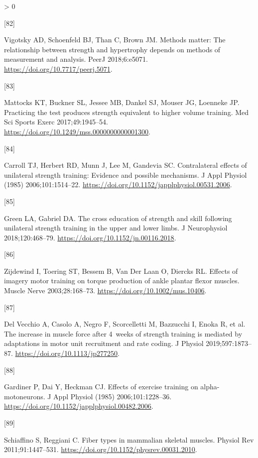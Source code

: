 \documentclass[twoside,10pt]{gihclass} %
\newlength{\cslhangindent}
\newlength{\csllabelwidth}
\newenvironment{CSLReferences}[3] %
 {%
  \setlength{\parindent}{0pt}
  \ifodd #1 \everypar{\setlength{\hangindent}{\cslhangindent}}\ignorespaces\fi
  \ifnum #2 > 0
  \setlength{\parskip}{#2\baselineskip}
  \fi
 }%
 {}
\newcommand{\CSLLeftMargin}[1]{\parbox[t]{\maxof{\widthof{#1}}{\csllabelwidth}}{#1}}
\newcommand{\CSLRightInline}[1]{\parbox[t]{\linewidth}{#1}}
\begin{document}
\begin{CSLReferences}{0}{0}
\leavevmode\hypertarget{ref-RN2158}{}%
\CSLLeftMargin{{[}82{]} }
\CSLRightInline{Vigotsky AD, Schoenfeld BJ, Than C, Brown JM. Methods matter: The relationship between strength and hypertrophy depends on methods of measurement and analysis. PeerJ 2018;6:e5071. \url{https://doi.org/10.7717/peerj.5071}.}

\leavevmode\hypertarget{ref-RN2760}{}%
\CSLLeftMargin{{[}83{]} }
\CSLRightInline{Mattocks KT, Buckner SL, Jessee MB, Dankel SJ, Mouser JG, Loenneke JP. Practicing the test produces strength equivalent to higher volume training. Med Sci Sports Exerc 2017;49:1945--54. \url{https://doi.org/10.1249/mss.0000000000001300}.}

\leavevmode\hypertarget{ref-RN2219}{}%
\CSLLeftMargin{{[}84{]} }
\CSLRightInline{Carroll TJ, Herbert RD, Munn J, Lee M, Gandevia SC. Contralateral effects of unilateral strength training: Evidence and possible mechanisms. J Appl Physiol (1985) 2006;101:1514--22. \url{https://doi.org/10.1152/japplphysiol.00531.2006}.}

\leavevmode\hypertarget{ref-RN2766}{}%
\CSLLeftMargin{{[}85{]} }
\CSLRightInline{Green LA, Gabriel DA. The cross education of strength and skill following unilateral strength training in the upper and lower limbs. J Neurophysiol 2018;120:468--79. \url{https://doi.org/10.1152/jn.00116.2018}.}

\leavevmode\hypertarget{ref-RN2767}{}%
\CSLLeftMargin{{[}86{]} }
\CSLRightInline{Zijdewind I, Toering ST, Bessem B, Van Der Laan O, Diercks RL. Effects of imagery motor training on torque production of ankle plantar flexor muscles. Muscle Nerve 2003;28:168--73. \url{https://doi.org/10.1002/mus.10406}.}

\leavevmode\hypertarget{ref-RN2763}{}%
\CSLLeftMargin{{[}87{]} }
\CSLRightInline{Del Vecchio A, Casolo A, Negro F, Scorcelletti M, Bazzucchi I, Enoka R, et al. The increase in muscle force after 4~weeks of strength training is mediated by adaptations in motor unit recruitment and rate coding. J Physiol 2019;597:1873--87. \url{https://doi.org/10.1113/jp277250}.}

\leavevmode\hypertarget{ref-RN2764}{}%
\CSLLeftMargin{{[}88{]} }
\CSLRightInline{Gardiner P, Dai Y, Heckman CJ. Effects of exercise training on alpha-motoneurons. J Appl Physiol (1985) 2006;101:1228--36. \url{https://doi.org/10.1152/japplphysiol.00482.2006}.}

\leavevmode\hypertarget{ref-RN819}{}%
\CSLLeftMargin{{[}89{]} }
\CSLRightInline{Schiaffino S, Reggiani C. Fiber types in mammalian skeletal muscles. Physiol Rev 2011;91:1447--531. \url{https://doi.org/10.1152/physrev.00031.2010}.}


\end{CSLReferences}
\end{document}
